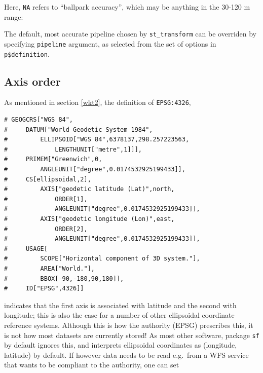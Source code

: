 \documentclass[]{book}
\newenvironment{Shaded}{\begin{snugshade}}{\end{snugshade}}
\newcommand{\CommentTok}[1]{\textcolor[rgb]{0.56,0.35,0.01}{\textit{#1}}}
\newcommand{\KeywordTok}[1]{\textcolor[rgb]{0.13,0.29,0.53}{\textbf{#1}}}
\newcommand{\NormalTok}[1]{#1}
\newcommand{\OperatorTok}[1]{\textcolor[rgb]{0.81,0.36,0.00}{\textbf{#1}}}
\begin{document}
Here, \texttt{NA} refers to ``ballpark accuracy'', which may be anything in the
30-120 m range:

\begin{Shaded}
\end{Shaded}

The default, most accurate pipeline chosen by \texttt{st\_transform} can
be overriden by specifying \texttt{pipeline} argument, as selected from
the set of options in \texttt{p\$definition}.

\hypertarget{axisorder}{%
\subsection{Axis order}\label{axisorder}}

As mentioned in section \ref{wkt2}, the definition of \texttt{EPSG:4326},

\begin{verbatim}
# GEOGCRS["WGS 84",
#     DATUM["World Geodetic System 1984",
#         ELLIPSOID["WGS 84",6378137,298.257223563,
#             LENGTHUNIT["metre",1]]],
#     PRIMEM["Greenwich",0,
#         ANGLEUNIT["degree",0.0174532925199433]],
#     CS[ellipsoidal,2],
#         AXIS["geodetic latitude (Lat)",north,
#             ORDER[1],
#             ANGLEUNIT["degree",0.0174532925199433]],
#         AXIS["geodetic longitude (Lon)",east,
#             ORDER[2],
#             ANGLEUNIT["degree",0.0174532925199433]],
#     USAGE[
#         SCOPE["Horizontal component of 3D system."],
#         AREA["World."],
#         BBOX[-90,-180,90,180]],
#     ID["EPSG",4326]]
\end{verbatim}

indicates that the first axis is associated with latitude and the
second with longitude; this is also the case for a number of other
ellipsoidal coordinate reference systems. Although this is how
the authority (EPSG) prescribes this, it is not how most datasets
are currently stored! As most other software, package \texttt{sf} by default
ignores this, and interprets ellipsoidal coordinates as (longitude,
latitude) by default. If however data needs to be read e.g.~from a
WFS service that wants to be compliant to the authority, one can set
\end{document}
